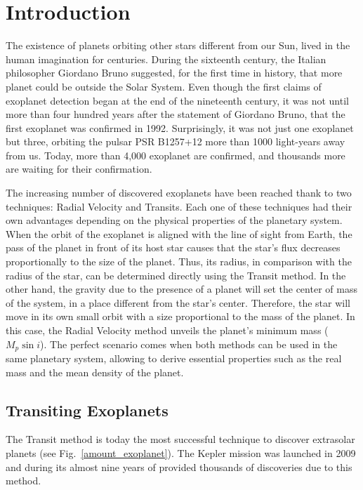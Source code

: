 \chapter{Introduction}\label{chap:intro}
The existence of planets orbiting other stars different from our Sun, lived in the human imagination for centuries. During the sixteenth century, the Italian philosopher Giordano Bruno suggested, for the first time in history, that more planet could be outside the Solar System. Even though the first claims of exoplanet detection began at the end of the nineteenth century, it was not until more than four hundred years after the statement of Giordano Bruno, that the first exoplanet was confirmed in 1992. Surprisingly, it was not just one exoplanet but three, orbiting the pulsar PSR B1257+12 more than 1000 light-years away from us. Today, more than 4,000 exoplanet are confirmed, and thousands more are waiting for their confirmation.

The increasing number of discovered exoplanets have been reached thank to two techniques: Radial Velocity and Transits. Each one of these techniques had their own advantages depending on the physical properties of the planetary system. When the orbit of the exoplanet is aligned with the line of sight from Earth, the pass of the planet in front of its host star causes that the star's flux decreases proportionally to the size of the planet. Thus, its radius, in comparison with the radius of the star, can be determined directly using the Transit method. In the other hand, the gravity due to the presence of a planet will set the center of mass of the system, in a place different from the star's center. Therefore, the star will move in its own small orbit with a size proportional to the mass of the planet. In this case, the Radial Velocity method unveils the planet's minimum mass ($M_{p}\sin i$). The perfect scenario comes when both methods can be used in the same planetary system, allowing to derive essential properties such as the real mass and the mean density of the planet.


\section{Transiting Exoplanets}
The Transit method is today the most successful technique to discover extrasolar planets (see Fig.~\ref{amount_exoplanet}). The Kepler mission was launched in 2009 and during its almost nine years of provided thousands of discoveries due to this method.

